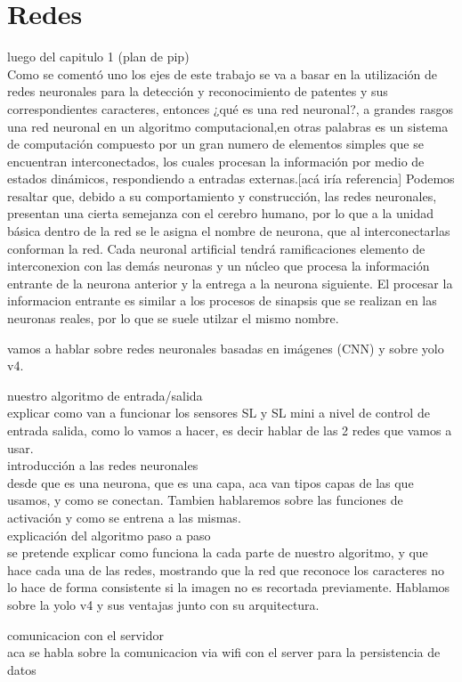 \section{Redes}

luego del capitulo 1 (plan de pip)\\

Como se comentó uno los ejes de este trabajo se va a basar en la utilización de redes neuronales para la detección y reconocimiento de patentes y sus correspondientes caracteres, entonces ¿qué es una red neuronal?, a grandes rasgos una red neuronal en un algoritmo computacional,en otras palabras es un sistema de computación compuesto por un gran numero de elementos simples que se encuentran interconectados, los cuales procesan la información por medio de estados dinámicos, respondiendo a entradas externas.[acá iría referencia]
Podemos resaltar que, debido a su comportamiento y construcción, las redes neuronales, presentan una cierta semejanza con el cerebro humano, por lo que a la unidad básica dentro de la red se le asigna el nombre de neurona, que al interconectarlas conforman la red.
Cada neuronal artificial tendrá ramificaciones elemento de interconexion con las demás neuronas y un núcleo que procesa la información entrante de la neurona anterior y la entrega a la neurona siguiente. El procesar la informacion entrante es similar a los procesos de sinapsis que se realizan en las neuronas reales, por lo que se suele utilzar el mismo nombre.

vamos a hablar sobre redes neuronales basadas en imágenes (CNN) y sobre yolo v4.

nuestro algoritmo de entrada/salida \\

explicar como van a funcionar los sensores SL y SL mini a nivel de control de entrada salida,
como lo vamos a hacer, es decir hablar de las 2 redes que vamos a usar. \\

introducción a las redes neuronales \\
desde que es una neurona, que es una capa, aca van tipos capas de las que usamos, y como se conectan. Tambien hablaremos sobre las funciones de activación y como se entrena a las mismas. \\

explicación del algoritmo paso a paso \\

se pretende explicar como funciona la cada parte de nuestro algoritmo, y que hace cada una de las redes, mostrando que la red que reconoce los caracteres no lo hace de forma consistente si la imagen no es recortada previamente. Hablamos sobre la yolo v4 y sus ventajas junto con su arquitectura.

comunicacion con el servidor \\

aca se habla sobre la comunicacion via wifi con el server para la persistencia de datos \\